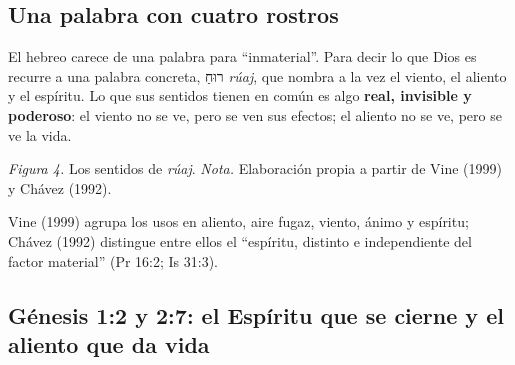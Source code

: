 \documentclass[11pt,letterpaper]{article}
\newcommand{\heb}[1]{\mbox{\foreignlanguage{hebrew}{#1}}}
\newcommand{\destacar}[1]{\textbf{\textcolor{azul}{#1}}}
\begin{document}
\subsection{Una palabra con cuatro rostros}

El hebreo carece de una palabra para ``inmaterial''. Para decir lo que Dios es recurre a una palabra concreta, \heb{רוּחַ} \emph{rúaj}, que nombra a la vez el viento, el aliento y el espíritu. Lo que sus sentidos tienen en común es algo \destacar{real, invisible y poderoso}: el viento no se ve, pero se ven sus efectos; el aliento no se ve, pero se ve la vida.

\begin{center}
\par
{\footnotesize\color{gris}\textit{Figura 4.} Los sentidos de \emph{rúaj}. \textit{Nota.} Elaboración propia a partir de Vine (1999) y Chávez (1992).}
\end{center}

Vine (1999) agrupa los usos en aliento, aire fugaz, viento, ánimo y espíritu; Chávez (1992) distingue entre ellos el ``espíritu, distinto e independiente del factor material'' (Pr 16:2; Is 31:3).

\subsection{Génesis 1:2 y 2:7: el Espíritu que se cierne y el aliento que da vida}
\end{document}

